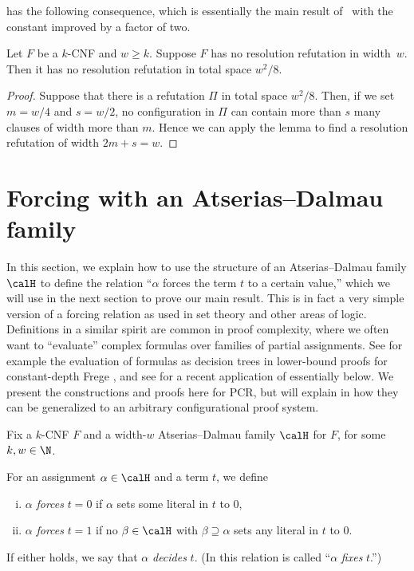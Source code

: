  has the following consequence, which is essentially
the main result of~\cite{DBLP:conf/icalp/Bonacina16} with 
the constant improved by a factor of two.


\begin{corollary}
\label{cor:Bon}
Let $F$ be a $k$-CNF and $w \ge k$.
Suppose $F$ has no resolution refutation in width~$w$.
Then it has no resolution refutation in total space ${w}^2/8$.
\end{corollary}

\begin{proof}
Suppose that there is a refutation $\Pi$ in total space ${w}^2/8$.
Then, if we set $m=w/4$ and $s=w/2$, no configuration in $\Pi$
can contain more than $s$ many clauses of width more than $m$.
Hence we can apply the lemma to find a resolution refutation
of width $2m+s = w$.
\end{proof}




%
\section{Forcing with an Atserias--Dalmau family}\label{sec:forcing}
%

In this section, we explain how to use the structure of an Atserias--Dalmau family $\calH$
to define the relation ``$\alpha$ forces the term $t$ to a certain value,''
which we will use in the next section to prove our main result.
This is in fact a very simple version of a forcing relation as used in  
set theory and other areas of logic. 
Definitions in a similar spirit are common in proof complexity, where we
often want to ``evaluate'' complex formulas over families of partial assignments.
See for example the evaluation of formulas as decision trees in lower-bound
proofs for constant-depth %
Frege \cite{Pitassi_PHP, Krajicek_PHP},   %
and see \cite{Pudlak2019, kolodziejczyk2018approximate} 
for a recent application of essentially  below.
We present the constructions and proofs here for PCR, but
will explain in 
how they can be generalized to an arbitrary configurational proof system.

Fix a $k$-CNF $F$ and a width-$w$ Atserias--Dalmau family $\calH$
for $F$, for some $k,w \in \N$.

\begin{definition} \label{def:fixing}
For an assignment $\alpha \in \calH$ and a term $t$, we define
\begin{enumerate}[(i)]
\item
$\alpha$ \emph{forces} $t=0$ if $\alpha$ sets some literal in $t$ to $0$,
\item
$\alpha$ \emph{forces} $t=1$ if no $\beta \in \calH$ with $\beta \supseteq \alpha$ sets any
literal in $t$ to $0$. 
\end{enumerate}
If either holds, 
we say that $\alpha$ \emph{decides} $t$.
(In \cite{conf-version,Pudlak2019} this relation is called 
``$\alpha$ \emph{fixes} $t$.'')
\end{definition}

